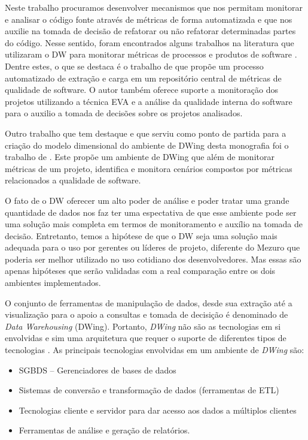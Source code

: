 Neste trabalho procuramos desenvolver mecanismos que nos permitam monitorar e analisar o código fonte através de métricas de forma automatizada e que nos auxilie na tomada de decisão de refatorar ou não refatorar determinadas partes do código. 
%
Nesse sentido, foram encontrados alguns trabalhos na literatura que utilizaram o DW para monitorar métricas de processos e produtos de software \cite{Folleco2007} \cite{Silveira2010}\cite{mazuco2011}. Dentre estes, o que se destaca é o trabalho de  \cite{Silveira2010} que propõe um processo automatizado de extração e carga em um repositório central de métricas de qualidade de software. O autor também oferece suporte a monitoração dos projetos utilizando a técnica EVA e a análise da qualidade interna do software para o auxilio a tomada de decisões sobre os projetos analisados. 

Outro trabalho que tem destaque e que serviu como ponto de partida para a criação do modelo dimensional do ambiente de DWing desta monografia foi o trabalho de \cite{rego2014}. Este propõe um ambiente de DWing que além de monitorar métricas de um projeto,  identifica e monitora cenários compostos por métricas relacionados a qualidade de software.

% 
O fato de o DW oferecer um alto poder de análise e poder tratar uma grande quantidade de dados nos faz ter uma espectativa de que esse ambiente pode ser uma solução mais completa em termos de monitoramento e auxílio na tomada de decisão. Entretanto, temos a hipótese de que o DW seja uma solução mais adequada para o uso por gerentes ou líderes de projeto, diferente do Mezuro que poderia ser melhor utilizado no uso cotidiano dos desenvolvedores. Mas essas são apenas hipóteses que serão validadas com a real comparação entre os dois ambientes implementados.

O conjunto de ferramentas de manipulação de dados, desde sua extração até a visualização para o apoio a consultas e tomada de decisição é denominado de \emph{Data Warehousing} (DWing). Portanto,  \emph{DWing} não são as tecnologias em si envolvidas e sim uma arquitetura que requer o suporte de diferentes tipos de tecnologias \cite{inmon2002}.  As principais tecnologias envolvidas em um ambiente de \emph{DWing} são:


\begin{itemize}
\item SGBDS – Gerenciadores de bases de dados
\item Sistemas de conversão e transformação de dados (ferramentas de ETL)
\item Tecnologias cliente e servidor para dar acesso aos dados a múltiplos clientes
\item Ferramentas de análise e geração de relatórios.
\end{itemize}


